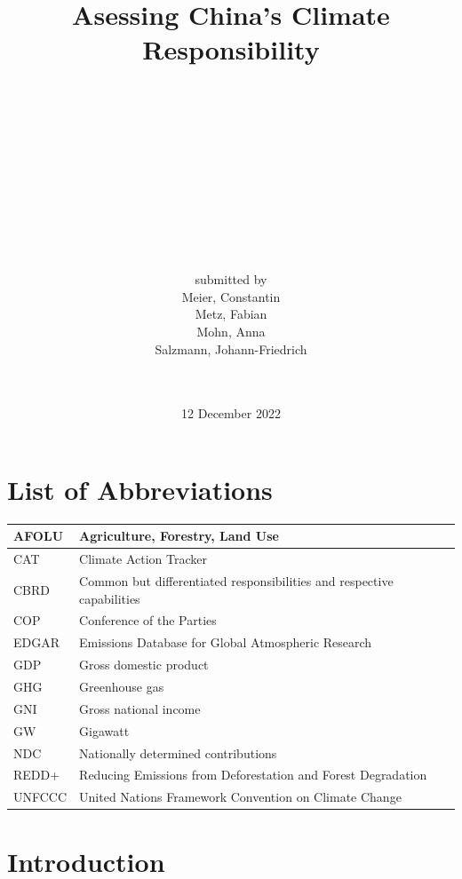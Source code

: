 \documentclass[
  12pt,
]{article}
\title{Asessing China's Climate Responsibility\\
\strut \\
\strut \\
\strut \\}
\subtitle{\textbf{Final Paper}\\
\strut \\
\strut \\
GRAD-E1402\\
Data Perspectives on GHG Emissions\\
Hertie School of Governance\\
\strut \\}
\author{submitted by\\
Meier, Constantin\\
Metz, Fabian\\
Mohn, Anna\\
Salzmann, Johann-Friedrich\\
\strut \\}
\date{12 December 2022}
\numberwithin{equation}{section}
\numberwithin{table}{section}
\numberwithin{figure}{section}
\begin{document}
\maketitle

\renewcommand{\harvardand}{\&}

\thispagestyle{empty}

\newpage
{}
\section*{List of Abbreviations}
\thispagestyle{empty}
\onehalfspacing

\begin{table}[!ht]
    \centering
    \begin{tabular}{|l|l|}
    \hline
        AFOLU &  Agriculture, Forestry, Land Use  \\ \hline
        CAT &  Climate Action Tracker  \\ \hline
        CBRD &  Common but differentiated responsibilities and respective capabilities  \\ \hline
        COP &  Conference of the Parties  \\ \hline
        EDGAR &  Emissions Database for Global Atmospheric Research  \\ \hline
        GDP &  Gross domestic product  \\ \hline
        GHG &  Greenhouse gas  \\ \hline
        GNI &  Gross national income  \\ \hline
        GW &  Gigawatt  \\ \hline
        NDC &  Nationally determined contributions  \\ \hline
        REDD+ &  Reducing Emissions from Deforestation and Forest Degradation  \\ \hline
        UNFCCC & United Nations Framework Convention on Climate Change \\ \hline
    \end{tabular}
\end{table}

\singlespacing
\newpage
{}
\tableofcontents
\thispagestyle{empty}
\onehalfspacing

\hypertarget{introduction}{%
\section{Introduction}\label{introduction}}
\end{document}
